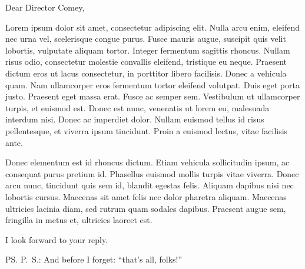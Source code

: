 \documentclass[a4paper,12pt,dvipsnames*]{letter}
\begin{document}
\begin{letter}{\recipient}

\opening{Dear Director Comey,}

Lorem ipsum dolor sit amet, consectetur adipiscing elit. Nulla arcu enim, eleifend nec urna vel, scelerisque congue purus. Fusce mauris augue, suscipit quis velit lobortis, vulputate aliquam tortor. Integer fermentum sagittis rhoncus. Nullam risus odio, consectetur molestie convallis eleifend, tristique eu neque. Praesent dictum eros ut lacus consectetur, in porttitor libero facilisis. Donec a vehicula quam. Nam ullamcorper eros fermentum tortor eleifend volutpat. Duis eget porta justo. Praesent eget massa erat. Fusce ac semper sem. Vestibulum ut ullamcorper turpis, et euismod est. Donec est nunc, venenatis ut lorem eu, malesuada interdum nisi. Donec ac imperdiet dolor. Nullam euismod tellus id risus pellentesque, et viverra ipsum tincidunt. Proin a euismod lectus, vitae facilisis ante.

Donec elementum est id rhoncus dictum. Etiam vehicula sollicitudin ipsum, ac consequat purus pretium id. Phasellus euismod mollis turpis vitae viverra. Donec arcu nunc, tincidunt quis sem id, blandit egestas felis. Aliquam dapibus nisi nec lobortis cursus. Maecenas sit amet felis nec dolor pharetra aliquam. Maecenas ultricies lacinia diam, sed rutrum quam sodales dapibus. Praesent augue sem, fringilla in metus et, ultricies laoreet est. 

I look forward to your reply.

\theend


\vspace{1.5em}
\ps{P.\ S.: And before I forget: ``that's all, folks!''}

\end{letter}
\end{document}
